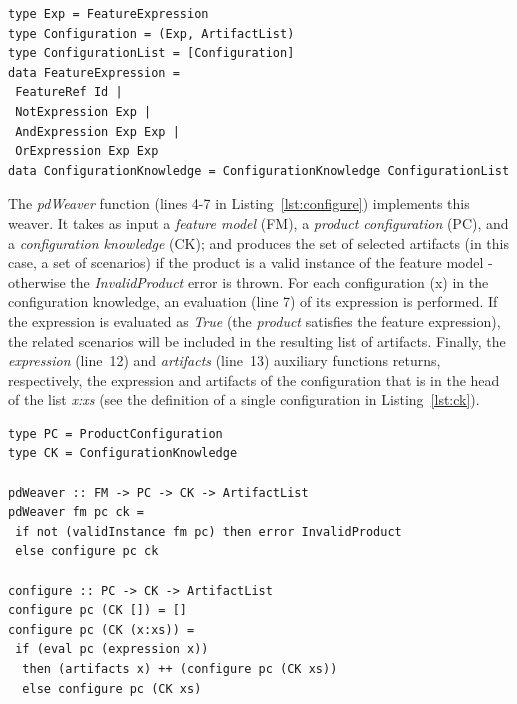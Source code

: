 \documentclass{llncs}
\begin{document}
\begin{lstlisting}[belowskip=20pt,frame=tb,caption={Configuration Knowledge},label=lst:ck]
type Exp = FeatureExpression
type Configuration = (Exp, ArtifactList)
type ConfigurationList = [Configuration]
data FeatureExpression =
 FeatureRef Id |
 NotExpression Exp |
 AndExpression Exp Exp |
 OrExpression Exp Exp
data ConfigurationKnowledge = ConfigurationKnowledge ConfigurationList
\end{lstlisting}

The \emph{pdWeaver} function (lines 4-7 in
Listing~\ref{lst:configure}) implements this weaver. It
takes as input a \emph{feature model} (FM), a \emph{product configuration} (PC),
and a \emph{configuration knowledge} (CK); and produces the set of
selected artifacts (in this case, a set of scenarios) if the product is a valid instance 
of the feature model - otherwise the \emph{InvalidProduct} error is thrown. For each
configuration (x) in the configuration knowledge, an evaluation (line 7) of its
expression is performed. If the expression is evaluated as
\emph{True} (the \emph{product} satisfies the feature expression), the
related scenarios will be included in the resulting list of artifacts. Finally, the 
\emph{expression} (line~12) and \emph{artifacts} (line~13) auxiliary functions returns, respectively, the expression 
and artifacts of the configuration that is in the head of the list \emph{x:xs} (see the definition of a single
configuration in Listing~\ref{lst:ck}).

\begin{lstlisting}[belowskip=20pt,frame=tb,caption={The \emph{configure weaver} function},label=lst:configure]
type PC = ProductConfiguration
type CK = ConfigurationKnowledge

pdWeaver :: FM -> PC -> CK -> ArtifactList
pdWeaver fm pc ck = 
 if not (validInstance fm pc) then error InvalidProduct
 else configure pc ck

configure :: PC -> CK -> ArtifactList
configure pc (CK []) = []
configure pc (CK (x:xs)) =
 if (eval pc (expression x))
  then (artifacts x) ++ (configure pc (CK xs))
  else configure pc (CK xs)
\end{lstlisting}
\end{document}
